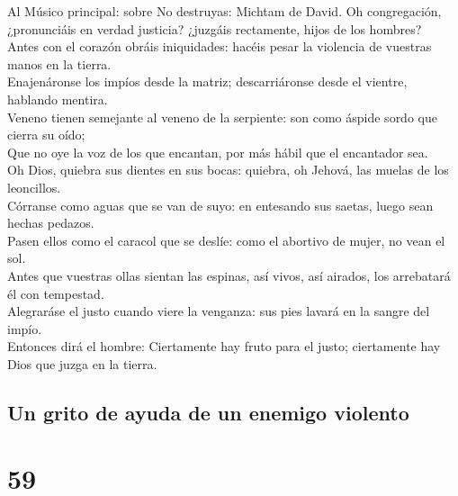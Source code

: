  Al Músico principal: sobre No destruyas: Michtam de
David. Oh congregación, ¿pronunciáis en verdad justicia? ¿juzgáis
rectamente, hijos de los hombres?\\
 Antes con el corazón obráis iniquidades: hacéis pesar la
violencia de vuestras manos en la tierra.\\
 Enajenáronse los impíos desde la matriz; descarriáronse
desde el vientre, hablando mentira.\\
 Veneno tienen semejante al veneno de la serpiente: son
como áspide sordo que cierra su oído;\\
 Que no oye la voz de los que encantan, por más hábil que
el encantador sea.\\
 Oh Dios, quiebra sus dientes en sus bocas: quiebra, oh
Jehová, las muelas de los leoncillos.\\
 Córranse como aguas que se van de suyo: en entesando sus
saetas, luego sean hechas pedazos.\\
 Pasen ellos como el caracol que se deslíe: como el
abortivo de mujer, no vean el sol.\\
 Antes que vuestras ollas sientan las espinas, así vivos,
así airados, los arrebatará él con tempestad.\\
 Alegraráse el justo cuando viere la venganza: sus pies
lavará en la sangre del impío.\\
 Entonces dirá el hombre: Ciertamente hay fruto para el
justo; ciertamente hay Dios que juzga en la tierra.

\hypertarget{un-grito-de-ayuda-de-un-enemigo-violento}{%
\subsection{Un grito de ayuda de un enemigo
violento}\label{un-grito-de-ayuda-de-un-enemigo-violento}}

\hypertarget{section-19-59}{%
\section{59}\label{section-19-59}}

